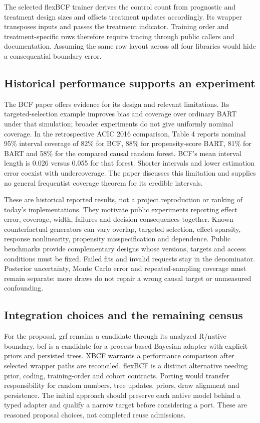 The selected flexBCF trainer derives the control count from prognostic and treatment design sizes and offsets treatment updates accordingly. Its wrapper transposes inputs and passes the treatment indicator. Training order and treatment-specific rows therefore require tracing through public callers and documentation. Assuming the same row layout across all four libraries would hide a consequential boundary error.\citep{exec21_cxx_flexbcf}

\subsection{Historical performance supports an experiment}
\label{exec21:cxx-evidence}
The BCF paper offers evidence for its design and relevant limitations. Its targeted-selection example improves bias and coverage over ordinary BART under that simulation; broader experiments do not give uniformly nominal coverage. In the retrospective ACIC 2016 comparison, Table 4 reports nominal 95\% interval coverage of 82\% for BCF, 88\% for propensity-score BART, 81\% for BART and 58\% for the compared causal random forest. BCF's mean interval length is 0.026 versus 0.055 for that forest. Shorter intervals and lower estimation error coexist with undercoverage. The paper discusses this limitation and supplies no general frequentist coverage theorem for its credible intervals.\citep{exec21_cxx_hahn}

These are historical reported results, not a project reproduction or ranking of today's implementations. They motivate public experiments reporting effect error, coverage, width, failures and decision consequences together. Known counterfactual generators can vary overlap, targeted selection, effect sparsity, response nonlinearity, propensity misspecification and dependence. Public benchmarks provide complementary designs whose versions, targets and access conditions must be fixed. Failed fits and invalid requests stay in the denominator. Posterior uncertainty, Monte Carlo error and repeated-sampling coverage must remain separate: more draws do not repair a wrong causal target or unmeasured confounding.\citep{exec21_cxx_hahn,exec21_cxx_reference}

\subsection{Integration choices and the remaining census}
\label{exec21:cxx-integration}
For the proposal, grf remains a candidate through its analyzed R/native boundary. bcf is a candidate for a process-based Bayesian adapter with explicit priors and persisted trees. XBCF warrants a performance comparison after selected wrapper paths are reconciled. flexBCF is a distinct alternative needing prior, coding, training-order and cohort contracts. Porting would transfer responsibility for random numbers, tree updates, priors, draw alignment and persistence. The initial approach should preserve each native model behind a typed adapter and qualify a narrow target before considering a port. These are reasoned proposal choices, not completed reuse admissions.\citep{exec21_cxx_grf,exec21_cxx_bcf,exec21_cxx_xbcf,exec21_cxx_flexbcf}

